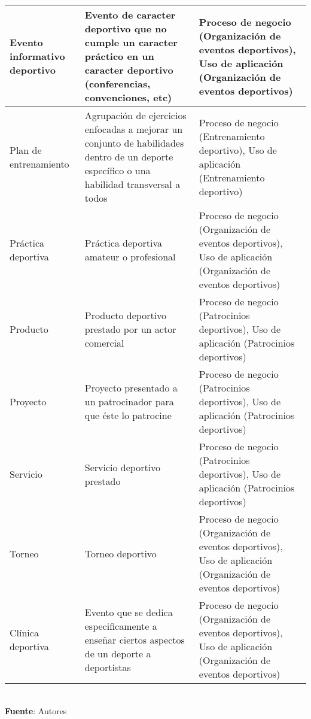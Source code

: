 \begin{table}[!htb]
\begin{center}
{\begin{tabular}{|p{4cm}|p{7cm}|p{4cm}|}
			\\
			\hline
			Evento informativo deportivo & 
			Evento de caracter deportivo que no cumple un caracter práctico en un caracter deportivo (conferencias, convenciones, etc) & 
			Proceso de negocio (Organización de eventos deportivos), Uso de aplicación (Organización de eventos deportivos)
			\\
			\hline
			Plan de entrenamiento & 
			Agrupación de ejercicios enfocadas a mejorar un conjunto de habilidades dentro de un deporte específico o una habilidad transversal a todos & 
			Proceso de negocio (Entrenamiento deportivo), Uso de aplicación (Entrenamiento deportivo)
			\\
			\hline
			Práctica deportiva & 
			Práctica deportiva amateur o profesional & 
			Proceso de negocio (Organización de eventos deportivos), Uso de aplicación (Organización de eventos deportivos)
			\\
			\hline
			Producto & 
			Producto deportivo prestado por un actor comercial & 
			Proceso de negocio (Patrocinios deportivos), Uso de aplicación (Patrocinios deportivos)
			\\
			\hline
			Proyecto & 
			Proyecto presentado a un patrocinador para que éste lo patrocine & 
			Proceso de negocio (Patrocinios deportivos), Uso de aplicación (Patrocinios deportivos)
			\\
			\hline
			Servicio & 
			Servicio deportivo prestado & 
			Proceso de negocio (Patrocinios deportivos), Uso de aplicación (Patrocinios deportivos)
			\\
			\hline
			Torneo & 
			Torneo deportivo & 
			Proceso de negocio (Organización de eventos deportivos), Uso de aplicación (Organización de eventos deportivos)
			\\
			\hline
			Clínica deportiva & 
			Evento que se dedica especificamente a enseñar ciertos aspectos de un deporte a deportistas & 
			Proceso de negocio (Organización de eventos deportivos), Uso de aplicación (Organización de eventos deportivos)
			\\
			\hline
		\end{tabular}
		} \\
		\textbf{Fuente}: Autores
	\end{center}
\end{table}

